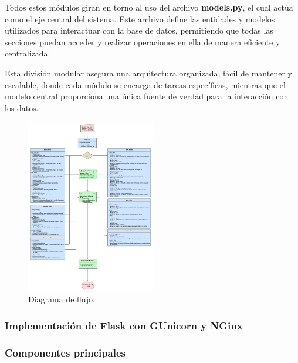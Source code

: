 Todos estos módulos giran en torno al uso del archivo \textbf{models.py}, el cual actúa como el eje central del sistema. Este archivo define las entidades y modelos utilizados para interactuar con la base de datos, permitiendo que todas las secciones puedan acceder y realizar operaciones en ella de manera eficiente y centralizada.

Esta división modular asegura una arquitectura organizada, fácil de mantener y escalable, donde cada módulo se encarga de tareas específicas, mientras que el modelo central proporciona una única fuente de verdad para la interacción con los datos.

\begin{figure}[H]
    \centering
    \includegraphics[width=0.5\textwidth]{figuras/diagrama_flujo.png}
    \caption{Diagrama de flujo.}
    \label{fig:diagrama_flujo}
\end{figure}


\subsubsection{Implementación de Flask con GUnicorn y NGinx}


\subsubsection*{Componentes principales}

